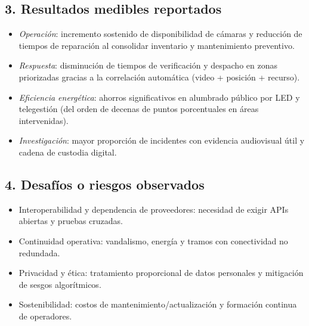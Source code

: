 \documentclass[12pt,a4paper]{article}
\begin{document}
\subsection*{3. Resultados medibles reportados}
\begin{itemize}
  \item \textit{Operación}: incremento sostenido de disponibilidad de cámaras y reducción de tiempos de reparación al consolidar inventario y mantenimiento preventivo.
  \item \textit{Respuesta}: disminución de tiempos de verificación y despacho en zonas priorizadas gracias a la correlación automática (video + posición + recurso).
  \item \textit{Eficiencia energética}: ahorros significativos en alumbrado público por LED y telegestión (del orden de decenas de puntos porcentuales en áreas intervenidas).
  \item \textit{Investigación}: mayor proporción de incidentes con evidencia audiovisual útil y cadena de custodia digital.
\end{itemize}

\subsection*{4. Desafíos o riesgos observados}
\begin{itemize}
  \item Interoperabilidad y dependencia de proveedores: necesidad de exigir APIs abiertas y pruebas cruzadas.
  \item Continuidad operativa: vandalismo, energía y tramos con conectividad no redundada.
  \item Privacidad y ética: tratamiento proporcional de datos personales y mitigación de sesgos algorítmicos.
  \item Sostenibilidad: costos de mantenimiento/actualización y formación continua de operadores.
\end{itemize}
\end{document}
